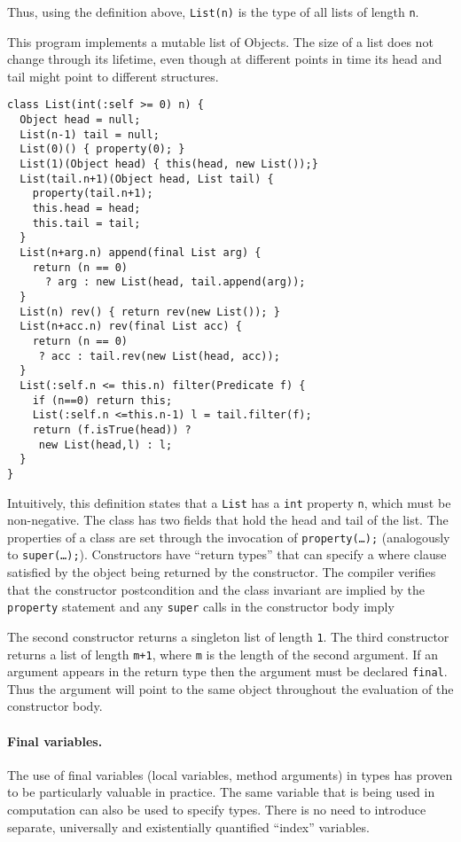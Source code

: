 Thus, using the definition above, {\tt List(n)} is the type of
all lists of length {\tt n}.

\begin{example}[List]
This program implements a mutable list of Objects. The size of a list
does not change through its lifetime, even though at different points
in time its head and tail might point to different structures.
{\footnotesize
\begin{verbatim}
class List(int(:self >= 0) n) {
  Object head = null;
  List(n-1) tail = null;
  List(0)() { property(0); }
  List(1)(Object head) { this(head, new List());}
  List(tail.n+1)(Object head, List tail) {
    property(tail.n+1);
    this.head = head;
    this.tail = tail;
  }
  List(n+arg.n) append(final List arg) {
    return (n == 0) 
      ? arg : new List(head, tail.append(arg));
  }
  List(n) rev() { return rev(new List()); }
  List(n+acc.n) rev(final List acc) {
    return (n == 0) 
     ? acc : tail.rev(new List(head, acc));
  }
  List(:self.n <= this.n) filter(Predicate f) {
    if (n==0) return this;
    List(:self.n <=this.n-1) l = tail.filter(f);
    return (f.isTrue(head)) ?
     new List(head,l) : l;
  }
}
\end{verbatim}}
\label{fig:list-example}
Intuitively, this definition states that a {\tt List} has a {\tt int}
property {\tt n}, which must be non-negative.  The class has two
fields that hold the head and tail of the list.  The properties of a
class are set through the invocation of {\tt property(\ldots);}
(analogously to {\tt super(\ldots);}).  Constructors have ``return
types'' that can specify a where clause satisfied by the object being
returned by the constructor.  The compiler verifies that the
constructor postcondition and the class invariant are implied by the
{\tt property} statement and any {\tt super} calls in the constructor
body imply

The second constructor returns a singleton list of length {\tt 1}. The
third constructor returns a list of length {\tt m+1}, where {\tt m} is
the length of the second argument.  If an argument appears in the
return type then the argument must be declared {\tt final}. Thus the
argument will point to the same object throughout the evaluation of
the constructor body.
\end{example}

\paragraph{Final variables.}
The use of final variables (local variables, method arguments) in
types has proven to be particularly valuable in practice. The same
variable that is being used in computation can also be used to specify
types. There is no need to introduce separate, universally and
existentially quantified ``index'' variables.

